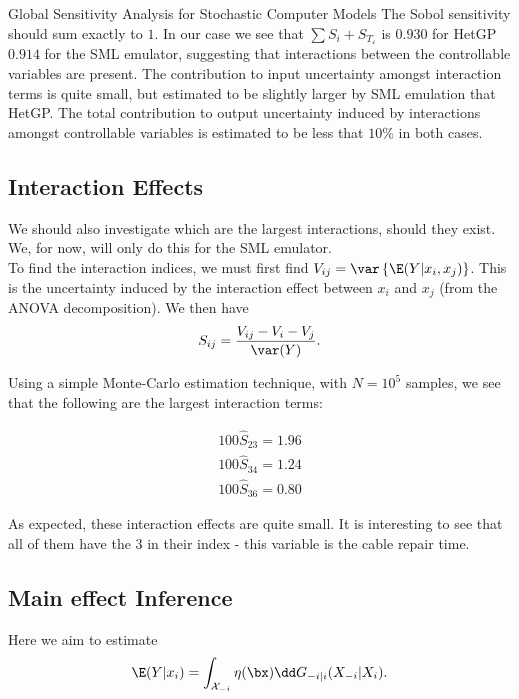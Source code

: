 \begin{chapter}{Global Sensitivity Analysis for Stochastic Computer Models}
The Sobol sensitivity should sum exactly to $1$. In our case we see that $\sum S_i + S_{T_\varepsilon}$ is $0.930$ for HetGP $0.914$ for the SML emulator, suggesting that interactions between the controllable variables are present. The contribution to input uncertainty amongst interaction terms is quite small, but estimated to be slightly larger by SML emulation that HetGP.  The total contribution to output uncertainty induced by interactions amongst controllable variables is estimated to be less that $10\%$ in both cases.

\subsection{Interaction Effects}

We should also investigate which are the largest interactions, should they exist. We, for now, will only do this for the SML emulator.\\

To find the interaction indices, we must first find $V_{ij} = \var \left\{ \E(Y | x_i, x_j) \right\}$. This is the uncertainty induced by the interaction effect between $x_i$ and $x_j$ (from the ANOVA decomposition). We then have
\begin{equation}
S_{ij} = \frac{V_{ij} - V_i - V_j}{\var(Y)}.
\end{equation}

Using a simple Monte-Carlo estimation technique, with $N = 10^5$ samples, we see that the following are the largest interaction terms:

\begin{align*}
	100\hat{S}_{23} = 1.96 \\
	100\hat{S}_{34} = 1.24 \\
	100\hat{S}_{36} = 0.80
\end{align*}

As expected, these interaction effects are quite small. It is interesting to see that all of them have the $3$ in their index - this variable is the cable repair time.
\subsection{Main effect Inference}

Here we aim to  estimate
\begin{equation}
	\E(Y | x_i) = \int _{\mathcal{X}_{-i}} \eta(\bx) \dd G_{-i|i}(X_{-i} | X_i).
\end{equation}


\end{chapter}
